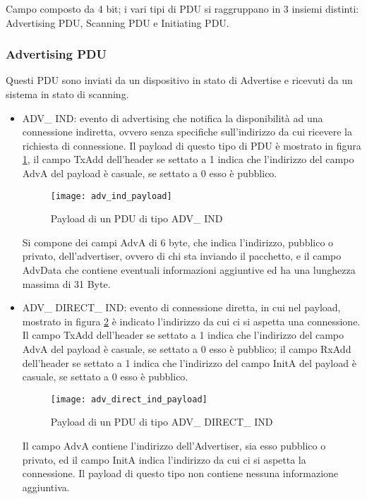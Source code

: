 Campo composto da 4 bit; i vari tipi di PDU si raggruppano in 3 insiemi distinti: Advertising PDU, Scanning PDU e Initiating PDU.

\subsubsection{Advertising PDU}

Questi PDU sono inviati da un dispositivo in stato di Advertise e ricevuti da un sistema in stato di scanning.

\begin{itemize}
\item ADV\_ IND: evento di advertising che notifica la disponibilità ad una connessione indiretta, ovvero senza specifiche sull'indirizzo da cui ricevere la richiesta di connessione.
Il payload di questo tipo di PDU è mostrato in figura \ref{adv_ind_payload}, il campo TxAdd dell'header se settato a 1 indica che l'indirizzo del campo AdvA del payload è casuale, se settato a 0 esso è pubblico.

\begin{figure}[H]
\texttt{[image: adv\_ind\_payload]}
\centering
\caption{Payload di un PDU di tipo ADV\_ IND }
\label{adv_ind_payload}
\end{figure}

Si compone dei campi AdvA di 6 byte, che indica l'indirizzo, pubblico o privato, dell'advertiser, ovvero di chi sta inviando il pacchetto, e il campo AdvData che contiene eventuali informazioni aggiuntive ed ha una lunghezza massima di 31 Byte.

\item ADV\_ DIRECT\_ IND: evento di connessione diretta, in cui nel payload, mostrato in figura \ref{adv_direct_ind_payload} è indicato l'indirizzo da cui ci si aspetta una connessione. Il campo TxAdd dell'header se settato a 1 indica che l'indirizzo del campo AdvA del payload è casuale, se settato a 0 esso è pubblico;
il campo RxAdd dell'header se settato a 1 indica che l'indirizzo del campo InitA del payload è casuale, se settato a 0 esso è pubblico. 

\begin{figure}[H]
\texttt{[image: adv\_direct\_ind\_payload]}
\centering
\caption{Payload di un PDU di tipo ADV\_ DIRECT\_ IND }
\label{adv_direct_ind_payload}
\end{figure}

Il campo AdvA contiene l'indirizzo dell'Advertiser, sia esso pubblico o privato, ed il campo InitA indica l'indirizzo da cui ci si aspetta la connessione. Il payload di questo tipo non contiene nessuna informazione aggiuntiva.


\end{itemize}
